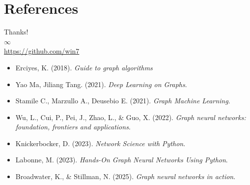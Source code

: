 \documentclass[aspectratio=169]{beamer}
\begin{document}
\section*{References}
    \begin{frame}
        \begin{center}
            {\Huge\calligra Thanks!} \\
            {\Huge $\infty$} \\
            \url{https://github.com/win7}
        \end{center}
    \end{frame}
    
    \begin{frame}[allowframebreaks]
        \footnotesize %
        
        \begin{itemize}
            \item Erciyes, K. (2018). \textit{Guide to graph algorithms} %
            \item Yao Ma, Jiliang Tang. (2021). \textit{Deep Learning on Graphs}.
            \item Stamile C., Marzullo A., Deusebio E. (2021). \textit{Graph Machine Learning}.
            \item Wu, L., Cui, P., Pei, J., Zhao, L., \& Guo, X. (2022). \textit{Graph neural networks: foundation, frontiers and applications}. %
            \item Knickerbocker, D. (2023). \textit{Network Science with Python}. %
            \item Labonne, M. (2023). \textit{Hands-On Graph Neural Networks Using Python}.
            \item Broadwater, K., \& Stillman, N. (2025). \textit{Graph neural networks in action}. %
        \end{itemize}
    \end{frame}
\end{document}
